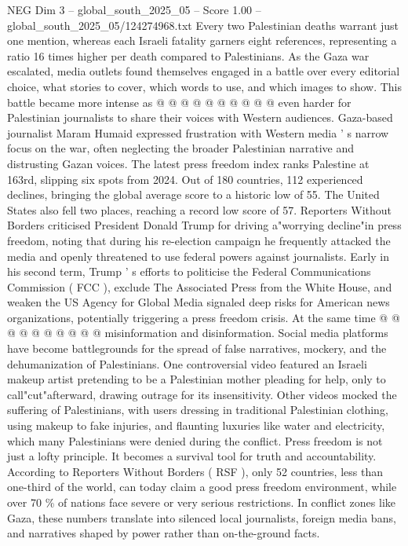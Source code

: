 \begin{textsample}{NEG Dim 3 – global\_south\_2025\_05 – Score 1.00 – global\_south\_2025\_05/124274968.txt}
Every two Palestinian deaths warrant just one mention, whereas each Israeli fatality garners eight references, representing a ratio 16 times higher per death compared to Palestinians.
As the Gaza war escalated, media outlets found themselves engaged in a battle over every editorial choice, what stories to cover, which words to use, and which images to show.
This battle became more intense as @ @ @ @ @ @ @ @ @ @ even harder for Palestinian journalists to share their voices with Western audiences.
Gaza-based journalist Maram Humaid expressed frustration with Western media ' s narrow focus on the war, often neglecting the broader Palestinian narrative and distrusting Gazan voices.
The latest press freedom index ranks Palestine at 163rd, slipping six spots from 2024.
Out of 180 countries, 112 experienced declines, bringing the global average score to a historic low of 55.
The United States also fell two places, reaching a record low score of 57.
Reporters Without Borders criticised President Donald Trump for driving a"worrying decline"in press freedom, noting that during his re-election campaign he frequently attacked the media and openly threatened to use federal powers against journalists.
Early in his second term, Trump ' s efforts to politicise the Federal Communications Commission ( FCC ), exclude The Associated Press from the White House, and weaken the US Agency for Global Media signaled deep risks for American news organizations, potentially triggering a press freedom crisis.
At the same time @ @ @ @ @ @ @ @ @ @ misinformation and disinformation.
Social media platforms have become battlegrounds for the spread of false narratives, mockery, and the dehumanization of Palestinians.
One controversial video featured an Israeli makeup artist pretending to be a Palestinian mother pleading for help, only to call"cut"afterward, drawing outrage for its insensitivity.
Other videos mocked the suffering of Palestinians, with users dressing in traditional Palestinian clothing, using makeup to fake injuries, and flaunting luxuries like water and electricity, which many Palestinians were denied during the conflict.
Press freedom is not just a lofty principle.
It becomes a survival tool for truth and accountability.
According to Reporters Without Borders ( RSF ), only 52 countries, less than one-third of the world, can today claim a good press freedom environment, while over 70 \% of nations face severe or very serious restrictions.
In conflict zones like Gaza, these numbers translate into silenced local journalists, foreign media bans, and narratives shaped by power rather than on-the-ground facts.

\end{textsample}

